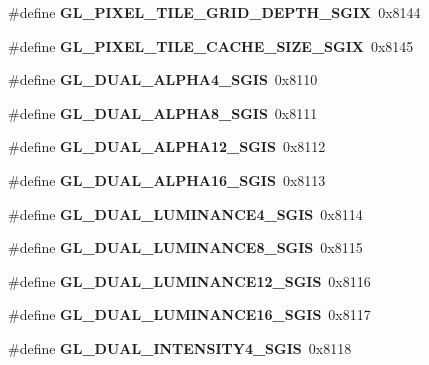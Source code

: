 \begin{DoxyCompactItemize}
\item 
\#define {\bfseries G\+L\+\_\+\+P\+I\+X\+E\+L\+\_\+\+T\+I\+L\+E\+\_\+\+G\+R\+I\+D\+\_\+\+D\+E\+P\+T\+H\+\_\+\+S\+G\+I\+X}~0x8144\label{_s_d_l__opengl_8h_a31d3f2fd15ceb68a0a5bc84606d7b48a}

\item 
\#define {\bfseries G\+L\+\_\+\+P\+I\+X\+E\+L\+\_\+\+T\+I\+L\+E\+\_\+\+C\+A\+C\+H\+E\+\_\+\+S\+I\+Z\+E\+\_\+\+S\+G\+I\+X}~0x8145\label{_s_d_l__opengl_8h_acd930ab818187241acb60696083909ea}

\item 
\#define {\bfseries G\+L\+\_\+\+D\+U\+A\+L\+\_\+\+A\+L\+P\+H\+A4\+\_\+\+S\+G\+I\+S}~0x8110\label{_s_d_l__opengl_8h_a0fcac5085d66a0e2c27299067d656cf7}

\item 
\#define {\bfseries G\+L\+\_\+\+D\+U\+A\+L\+\_\+\+A\+L\+P\+H\+A8\+\_\+\+S\+G\+I\+S}~0x8111\label{_s_d_l__opengl_8h_ab1aa1dadda52fc595da940aa0bf1eb5d}

\item 
\#define {\bfseries G\+L\+\_\+\+D\+U\+A\+L\+\_\+\+A\+L\+P\+H\+A12\+\_\+\+S\+G\+I\+S}~0x8112\label{_s_d_l__opengl_8h_ae72536e212ead85a200058dd1b5fac52}

\item 
\#define {\bfseries G\+L\+\_\+\+D\+U\+A\+L\+\_\+\+A\+L\+P\+H\+A16\+\_\+\+S\+G\+I\+S}~0x8113\label{_s_d_l__opengl_8h_a19c90d06610d9701abb5b0a95a3a0daa}

\item 
\#define {\bfseries G\+L\+\_\+\+D\+U\+A\+L\+\_\+\+L\+U\+M\+I\+N\+A\+N\+C\+E4\+\_\+\+S\+G\+I\+S}~0x8114\label{_s_d_l__opengl_8h_a7e65d99b38671d3a2ff1fa1e8d917c08}

\item 
\#define {\bfseries G\+L\+\_\+\+D\+U\+A\+L\+\_\+\+L\+U\+M\+I\+N\+A\+N\+C\+E8\+\_\+\+S\+G\+I\+S}~0x8115\label{_s_d_l__opengl_8h_a80fbaabf2e74fd6106c285fb3e3220d2}

\item 
\#define {\bfseries G\+L\+\_\+\+D\+U\+A\+L\+\_\+\+L\+U\+M\+I\+N\+A\+N\+C\+E12\+\_\+\+S\+G\+I\+S}~0x8116\label{_s_d_l__opengl_8h_ad1740e35f626aba623c900cb2d2c0d14}

\item 
\#define {\bfseries G\+L\+\_\+\+D\+U\+A\+L\+\_\+\+L\+U\+M\+I\+N\+A\+N\+C\+E16\+\_\+\+S\+G\+I\+S}~0x8117\label{_s_d_l__opengl_8h_a336c2215e1bd389670ff5c3f745b8bf5}

\item 
\#define {\bfseries G\+L\+\_\+\+D\+U\+A\+L\+\_\+\+I\+N\+T\+E\+N\+S\+I\+T\+Y4\+\_\+\+S\+G\+I\+S}~0x8118\label{_s_d_l__opengl_8h_a6f2ead46cd2c84a11530c967beb34764}


\end{DoxyCompactItemize}
